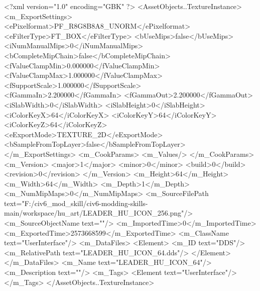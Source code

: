 <?xml version="1.0" encoding="GBK" ?>
<AssetObjects..TextureInstance>
	<m_ExportSettings>
		<ePixelformat>PF_R8G8B8A8_UNORM</ePixelformat>
		<eFilterType>FT_BOX</eFilterType>
		<bUseMips>false</bUseMips>
		<iNumManualMips>0</iNumManualMips>
		<bCompleteMipChain>false</bCompleteMipChain>
		<fValueClampMin>0.000000</fValueClampMin>
		<fValueClampMax>1.000000</fValueClampMax>
		<fSupportScale>1.000000</fSupportScale>
		<fGammaIn>2.200000</fGammaIn>
		<fGammaOut>2.200000</fGammaOut>
		<iSlabWidth>0</iSlabWidth>
		<iSlabHeight>0</iSlabHeight>
		<iColorKeyX>64</iColorKeyX>
		<iColorKeyY>64</iColorKeyY>
		<iColorKeyZ>64</iColorKeyZ>
		<eExportMode>TEXTURE_2D</eExportMode>
		<bSampleFromTopLayer>false</bSampleFromTopLayer>
	</m_ExportSettings>
	<m_CookParams>
		<m_Values/>
	</m_CookParams>
	<m_Version>
		<major>1</major>
		<minor>0</minor>
		<build>0</build>
		<revision>0</revision>
	</m_Version>
	<m_Height>64</m_Height>
	<m_Width>64</m_Width>
	<m_Depth>1</m_Depth>
	<m_NumMipMaps>0</m_NumMipMaps>
	<m_SourceFilePath text="F:/civ6_mod_skill/civ6-modding-skills-main/workspace/hu_art/LEADER_HU_ICON_256.png"/>
	<m_SourceObjectName text=""/>
	<m_ImportedTime>0</m_ImportedTime>
	<m_ExportedTime>2573668599</m_ExportedTime>
	<m_ClassName text="UserInterface"/>
	<m_DataFiles>
		<Element>
			<m_ID text="DDS"/>
			<m_RelativePath text="LEADER_HU_ICON_64.dds"/>
		</Element>
	</m_DataFiles>
	<m_Name text="LEADER_HU_ICON_64"/>
	<m_Description text=""/>
	<m_Tags>
		<Element text="UserInterface"/>
	</m_Tags>
</AssetObjects..TextureInstance>
